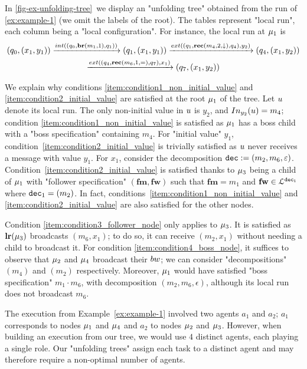 \begin{example}
	In \cref{fig-ex-unfolding-tree}~we display an "unfolding tree" obtained from the run of \cref{ex:example-1} (we omit the labels of the root). The tables represent "local run", each column being a "local configuration". For instance, the local run at $\mu_1$ is \begin{multline*}
	(q_0, (x_1,y_1)) \intstep{(q_0, \br{m_1}{1},q_1)} (q_1, (x_1, y_1)) \extbr{(q_1, \rec{m_4}{2}{\enregact}, q_4)}{y_2} (q_4, (x_1, y_2)) \\ \extbr{(q_4, \rec{m_6}{1}{\eqtestact}, q_7)}{x_1} (q_7, (x_1, y_2)) \end{multline*}
	
	We explain why conditions \ref{item:condition1_non_initial_value} and \ref{item:condition2_initial_value} are satisfied at the root $\mu_1$ of the tree. Let $u$ denote its local run.
	The only non-initial value in $u$ is $y_2$, and $\vinput{y_2}{\localrun} = m_4$; condition \ref{item:condition1_non_initial_value} is satisfied as $\mu_1$ has a boss child with a "boss specification" containing $m_4$. 
	For "initial value" $y_1$, condition~\ref{item:condition2_initial_value} is trivially satisfied as $u$ never receives a message with value $y_1$. For $x_1$, consider the decomposition $\mathtt{dec} := (m_2, m_6, \varepsilon)$. Condition~\ref{item:condition2_initial_value} is satisfied thanks to $\mu_3$ being a child of $\mu_1$ with "follower specification" $(\mathbf{fm}, \mathbf{fw})$ such that $\mathbf{fm} = m_1$ and $\mathbf{fw} \in \mathcal{L}^{\mathtt{\mathtt{dec}_1}}$ where $\mathtt{dec}_1 = (m_2)$. In fact, conditions~\ref{item:condition1_non_initial_value} and \ref{item:condition2_initial_value} are also satisfied for the other nodes. 
	
	Condition \ref{item:condition3_follower_node} only applies to $\mu_3$. It is satisfied as $\mathbf{lr}(\mu_3)$ broadcasts $(m_6,x_1)$; to do so, it can receive $(m_2,x_1)$ without needing a child to broadcast it. 
	For condition \ref{item:condition4_boss_node}, it suffices to observe that $\mu_2$ and $\mu_4$ broadcast their $\bossspec$; we can consider "decompositions" $(m_4)$ and $(m_2)$ respectively. Moreover, $\mu_1$ would have satisfied "boss specification" $m_1 \cdot m_6$, with decomposition $(m_2, m_6, \epsilon)$, although its local run does not broadcast $m_6$. 
	
	The execution from Example~\ref{ex:example-1} involved two agents $a_1$ and $a_2$; $a_1$ corresponds to nodes $\mu_1$ and $\mu_4$ and $a_2$ 
	to nodes $\mu_2$ and $\mu_3$. However, when building an execution from our tree, we would use $4$ distinct agents, each playing a single role. Our "unfolding trees" assign each task to a distinct agent and may therefore require a non-optimal number of agents.
\end{example}



